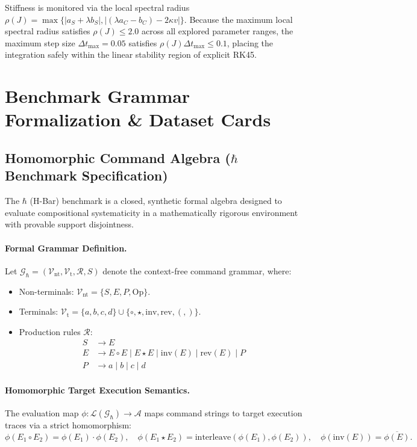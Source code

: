 \documentclass{article}
\theoremstyle{plain}
\theoremstyle{definition}
\begin{document}
Stiffness is monitored via the local spectral radius $\rho(J) = \max\{ |a_S + \lambda b_S|, |(\lambda a_C - b_C) - 2\kappa v| \}$. Because the maximum local spectral radius satisfies $\rho(J) \le 2.0$ across all explored parameter ranges, the maximum step size $\Delta t_{\text{max}} = 0.05$ satisfies $\rho(J) \Delta t_{\text{max}} \le 0.1$, placing the integration safely within the linear stability region of explicit RK45.

\section{Benchmark Grammar Formalization \& Dataset Cards}
\label{sec:appendix_datasets}

\subsection{Homomorphic Command Algebra (\texorpdfstring{$\hbar$}{H-Bar} Benchmark Specification)}
The $\hbar$ (H-Bar) benchmark is a closed, synthetic formal algebra designed to evaluate compositional systematicity in a mathematically rigorous environment with provable support disjointness.

\paragraph{Formal Grammar Definition.}
Let $\mathcal{G}_{\hbar} = (\mathcal{V}_{\text{nt}}, \mathcal{V}_{\text{t}}, \mathcal{R}, S)$ denote the context-free command grammar, where:
\begin{itemize}[noitemsep]
    \item Non-terminals: $\mathcal{V}_{\text{nt}} = \{S, E, P, \text{Op}\}$.
    \item Terminals: $\mathcal{V}_{\text{t}} = \{a, b, c, d\} \cup \{\circ, \star, \text{inv}, \text{rev}, (, )\}$.
    \item Production rules $\mathcal{R}$:
    \begin{align}
        S &\to E \\
        E &\to E \circ E \mid E \star E \mid \text{inv}(E) \mid \text{rev}(E) \mid P \\
        P &\to a \mid b \mid c \mid d
    \end{align}
\end{itemize}

\paragraph{Homomorphic Target Execution Semantics.}
The evaluation map $\phi: \mathcal{L}(\mathcal{G}_{\hbar}) \to \mathcal{A}$ maps command strings to target execution traces via a strict homomorphism:
\begin{equation}
    \phi(E_1 \circ E_2) = \phi(E_1) \cdot \phi(E_2), \quad \phi(E_1 \star E_2) = \text{interleave}(\phi(E_1), \phi(E_2)), \quad \phi(\text{inv}(E)) = \overline{\phi(E)}.
\end{equation}
\end{document}
